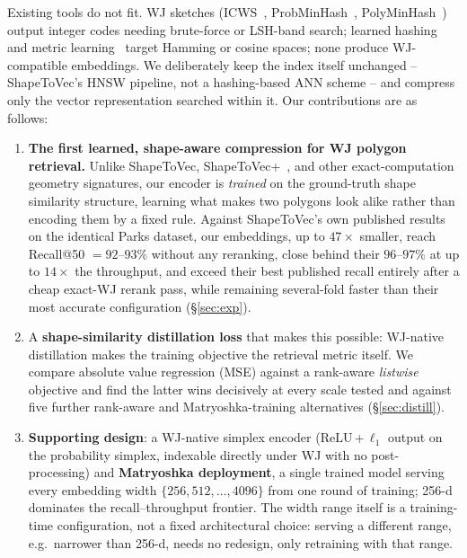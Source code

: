 \documentclass[sigconf]{acmart}
\begin{document}
Existing tools do not fit. WJ sketches (ICWS~\cite{ioffe10},
ProbMinHash~\cite{probminhash20}, PolyMinHash~\cite{polyminhash25}) output integer
codes needing brute-force or LSH-band search; learned hashing and metric
learning~\cite{hashsurvey14,deephashsurvey22} target Hamming or cosine spaces;
none produce WJ-compatible embeddings. We deliberately keep the index itself
unchanged -- ShapeToVec's HNSW pipeline, not a hashing-based ANN scheme -- and
compress only the vector representation searched within it. Our contributions are as follows:
\begin{enumerate}[leftmargin=1.2em,itemsep=1pt,topsep=1pt]
  \item \textbf{The first learned, shape-aware compression for WJ polygon retrieval.}
    Unlike ShapeToVec, ShapeToVec+~\cite{shapetovecplus26}, and other exact-computation
    geometry signatures, our encoder is \emph{trained} on the ground-truth shape
    similarity structure, learning what makes two polygons look alike rather than
    encoding them by a fixed rule. Against ShapeToVec's own published
    results~\cite{shape2vec} on the identical Parks dataset, our embeddings, up to
    $47\times$ smaller, reach Recall@50 $=92$--$93\%$ without any reranking, close
    behind their $96$--$97\%$ at up to $14\times$ the throughput, and exceed their best
    published recall entirely after a cheap exact-WJ rerank pass, while remaining
    several-fold faster than their most accurate configuration (\S\ref{sec:exp}).
  \item A \textbf{shape-similarity distillation loss} that makes this possible: WJ-native
    distillation makes the training objective the retrieval metric itself. We compare
    absolute value regression (MSE) against a rank-aware \emph{listwise} objective and
    find the latter wins decisively at every scale tested and against five further
    rank-aware and Matryoshka-training alternatives (\S\ref{sec:distill}).
  \item \textbf{Supporting design}: a WJ-native simplex encoder (ReLU\,+\,$\ell_1$
    output on the probability simplex, indexable directly under WJ with no
    post-processing) and \textbf{Matryoshka deployment}, a single trained model serving
    every embedding width $\{256, 512, \dots,4096\}$ from one round of training; 256-d
    dominates the recall--throughput frontier. The width range itself is a
    training-time configuration, not a fixed architectural choice: serving a different
    range, e.g.\ narrower than 256-d, needs no redesign, only retraining with that
    range.
\end{enumerate}
\end{document}

